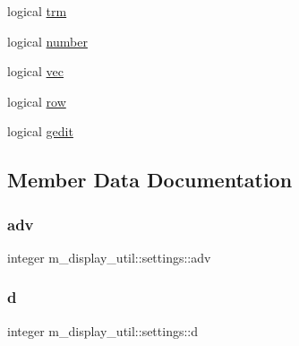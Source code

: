 \begin{DoxyCompactItemize}
\item 
logical \hyperlink{structm__display__util_1_1settings_aee8aaeb4f69cc02bcbc0ef0cd524af52}{trm}
\item 
logical \hyperlink{structm__display__util_1_1settings_aa6d5b31c3417ac137c12ef56b413de2c}{number}
\item 
logical \hyperlink{structm__display__util_1_1settings_a26be17f3439b252cbff6b846ac1efd3c}{vec}
\item 
logical \hyperlink{structm__display__util_1_1settings_ac5f1655b41bc8d746a001b768e8e8621}{row}
\item 
logical \hyperlink{structm__display__util_1_1settings_af002794ad38662e2b56edce4f1a98d68}{gedit}
\end{DoxyCompactItemize}


\subsection{Member Data Documentation}
\mbox{\label{structm__display__util_1_1settings_a48f4987f23486c4d34452ea07536db12}} 
\subsubsection{\texorpdfstring{adv}{adv}}
{\footnotesize\ttfamily integer m\+\_\+display\+\_\+util\+::settings\+::adv\hspace{0.3cm}{\ttfamily [private]}}

\mbox{\label{structm__display__util_1_1settings_ae723b191970109c2e0885e92cab1d52f}} 
\subsubsection{\texorpdfstring{d}{d}}
{\footnotesize\ttfamily integer m\+\_\+display\+\_\+util\+::settings\+::d\hspace{0.3cm}{\ttfamily [private]}}

\mbox{\label{structm__display__util_1_1settings_aa0350d08ea4df3bf1ce10823eedbb1ba}} 
